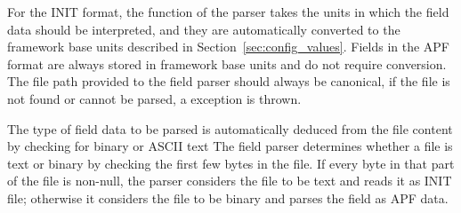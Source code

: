 For the INIT format, the  function of the parser takes the units in which the field data should be interpreted, and they are automatically converted to the framework base units described in Section~\ref{sec:config_values}. Fields in the APF format are always stored in framework base units and do not require conversion.
The file path provided to the field parser should always be canonical, if the file is not found or cannot be parsed, a  exception is thrown.

The type of field data to be parsed is automatically deduced from the file content by checking for binary or ASCII text
The field parser determines whether a file is text or binary by checking the first few bytes in the file.
If every byte in that part of the file is non-null, the parser considers the file to be text and reads it as INIT file; otherwise it considers the file to be binary and parses the field as APF data.

\label{sec:tcad_electric_field_converter}

\label{sec:root_analysis_macros}
